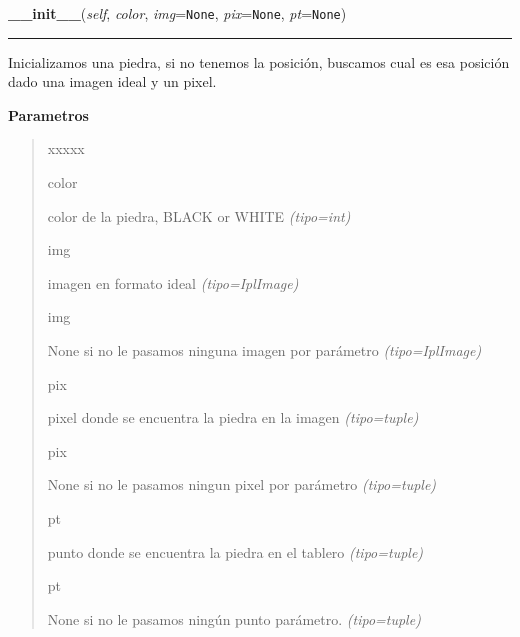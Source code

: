 \hspace{.8\funcindent}\begin{boxedminipage}{\funcwidth}

    \raggedright \textbf{\_\_init\_\_}(\textit{self}, \textit{color}, \textit{img}={\tt None}, \textit{pix}={\tt None}, \textit{pt}={\tt None})

    \vspace{-1.5ex}

    \rule{\textwidth}{0.5\fboxrule}
\setlength{\parskip}{2ex}
Inicializamos una piedra, si no tenemos la posición, buscamos cual es esa posición dado una imagen ideal y un pixel.

\setlength{\parskip}{1ex}
      \textbf{Parametros}
      \vspace{-1ex}

      \begin{quote}
        \begin{Ventry}{xxxxx}

          \item[color]


color de la piedra, BLACK or WHITE
            {\it (tipo=int)}

          \item[img]


imagen en formato ideal
            {\it (tipo=IplImage)}

          \item[img]


None si no le pasamos ninguna imagen por parámetro
            {\it (tipo=IplImage)}

          \item[pix]


pixel donde se encuentra la piedra en la imagen
            {\it (tipo=tuple)}

          \item[pix]


None si no le pasamos ningun pixel por parámetro
            {\it (tipo=tuple)}

          \item[pt]


punto donde se encuentra la piedra en el tablero
            {\it (tipo=tuple)}

          \item[pt]


None si no le pasamos ningún punto parámetro.
            {\it (tipo=tuple)}

        \end{Ventry}

      \end{quote}

    \end{boxedminipage}

